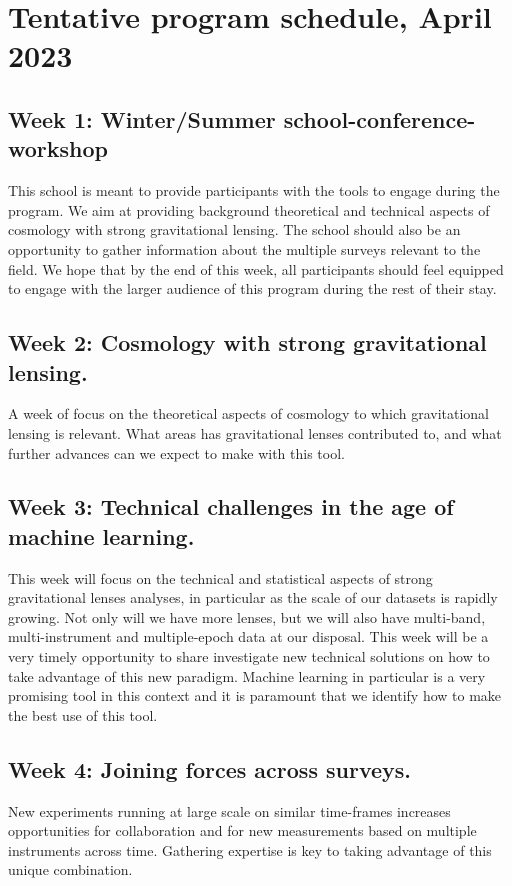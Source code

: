 \documentclass[11pt, letterpaper]{article}
\begin{document}
\section{Tentative program schedule, April 2023}

    \subsection{Week 1: Winter/Summer school-conference-workshop}
        This school is meant to provide participants with the tools to engage during the program. We aim at providing background theoretical and technical aspects of cosmology with strong gravitational lensing. The school should also be an opportunity to gather information about the multiple surveys relevant to the field. We hope that by the end of this week, all participants should feel equipped to engage with the larger audience of this program during the rest of their stay. 
    
    \subsection{Week 2: Cosmology with strong gravitational lensing.}
        A week of focus on the theoretical aspects of cosmology to which gravitational lensing is relevant. What areas has gravitational lenses contributed to, and what further advances can we expect to make with this tool.

    \subsection{Week 3: Technical challenges in the age of machine learning.}
        This week will focus on the technical and statistical aspects of strong gravitational lenses analyses, in particular as the scale of our datasets is rapidly growing. Not only will we have more lenses, but we will also have multi-band, multi-instrument and multiple-epoch data at our disposal. This week will be a very timely opportunity to share investigate new technical solutions on how to take advantage of this new paradigm. Machine learning in particular is a very promising tool in this context and it is paramount that we identify how to make the best use of this tool. 
        
    \subsection{Week 4: Joining forces across surveys.}
        New experiments running at large scale on similar time-frames increases opportunities for collaboration and for new measurements based on multiple instruments across time. Gathering expertise is key to taking advantage of this unique combination.
\end{document}
